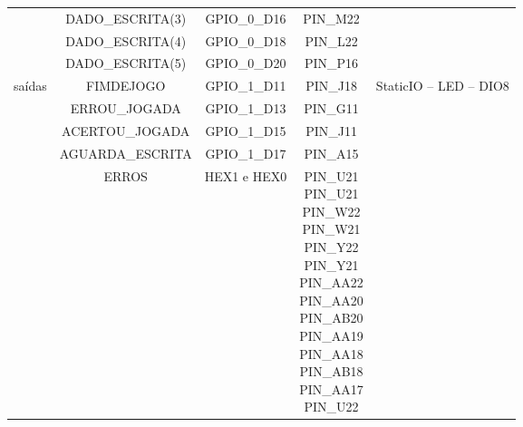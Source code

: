 \documentclass[amsmath,amssymb,floatfix]{report}
\begin{document}
\begin{table}[H]
\begin{tabular}{c|c|c|c|c|}
\multicolumn{1}{|c|}{}                           & DADO\_ESCRITA(3)        & GPIO\_0\_D16         & PIN\_M22                                                                                                                                                                              &   \\ \cline{2-5} 
\multicolumn{1}{|c|}{}                           & DADO\_ESCRITA(4)        & GPIO\_0\_D18         & PIN\_L22                                                                                                                                                                              &   \\ \cline{2-5} 
\multicolumn{1}{|c|}{}                           & DADO\_ESCRITA(5)        & GPIO\_0\_D20         & PIN\_P16                                                                                                                                                                              &   \\ \hline
\multicolumn{1}{|c|}{\multirow{18}{*}{saídas}}    & FIMDEJOGO               & GPIO\_1\_D11         & PIN\_J18                                                                                                                                                                              & StaticIO – LED – DIO8          \\ \cline{2-5} 
\multicolumn{1}{|c|}{}                           & ERROU\_JOGADA                   & GPIO\_1\_D13          & PIN\_G11  & \\ \cline{2-5}
\multicolumn{1}{|c|}{}                           & ACERTOU\_JOGADA                   & GPIO\_1\_D15          & PIN\_J11 & \\ \cline{2-5}
\multicolumn{1}{|c|}{}                           & AGUARDA\_ESCRITA                   & GPIO\_1\_D17          & PIN\_A15  & \\ \cline{2-5}
\multicolumn{1}{|c|}{}                           & ERROS                   & HEX1 e HEX0          & \thead{PIN\_U21 \\ PIN\_U21 \\ PIN\_W22 \\ PIN\_W21 \\ PIN\_Y22 \\ PIN\_Y21 \\ PIN\_AA22 \\ PIN\_AA20 \\ PIN\_AB20 \\ PIN\_AA19 \\ PIN\_AA18 \\ PIN\_AB18 \\ PIN\_AA17 \\ PIN\_U22}   &                                \\ \hline

\end{tabular}
\end{table}
\end{document}
